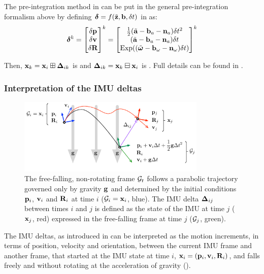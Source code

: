 The pre-integration method in  \cite{forster2017-TRO} can be put in the general pre-integration formalism above by defining 
$\bm\delta=f(\tilde{{\bf z}},{\bf b},\delta t)$ in  as:
%
\begin{align}
    \bm\delta^k = \begin{bmatrix}
    \delta{\bf p}\\\delta{\bf v}\\\delta{\bf R}
    \end{bmatrix}^k =
    \begin{bmatrix}
    \tfrac12(\tilde{{\bf a}}-{\bf b}_a-{\bf n}_a)\delta t^2 \\
    (\tilde{{\bf a}}-{\bf b}_a-{\bf n}_a)\delta t \\
    \operatorname*{Exp}((\tilde{{\bm \omega}}-{\bf b}_\omega-{\bf n}_\omega)\delta t)
    \end{bmatrix}^k
    \label{eq:delta_function}
\end{align}

Then, ${\bf x}_k={\bf x}_i\boxplus{{\bm \Delta}}_{ik}$ is \cite[eq.~32]{forster2017-TRO} and ${{\bm \Delta}}_{ik}={\bf x}_k\boxminus{\bf x}_i$ is \cite[eq.~33]{forster2017-TRO}. 
Full details can be found in \cite[Section 3.4]{atchuthan-18-thesis}.

\subsubsection{Interpretation of the IMU deltas}

\begin{figure}[h]
\centering
\includegraphics[width=0.8\textwidth]{figures/fff}
\caption{The free-falling, non-rotating frame $\mathcal{G}_t$ follows a parabolic trajectory governed only by gravity ${\bf g}$ and determined by the initial conditions ${\bf p}_i$, ${\bf v}_i$ and ${\bf R}_i$ at time $i$ ($\mathcal{G}_i={\bf x}_i$, blue). The IMU delta ${{\bm \Delta}}_{ij}$ between times $i$ and $j$ is defined as the state of the IMU at time $j$ (${\bf x}_j$, red) expressed in the free-falling frame at time $j$ ($\mathcal{G}_j$, green).}
\label{fig:fff}
\end{figure}

The IMU deltas, as introduced in \cite{lupton-09, forster2015imu} can be interpreted \cite{atchuthan-18-thesis} as the motion increments, in terms of position, velocity and orientation, between the current IMU frame and another frame, that started at the IMU state at time $i$, ${\bf x}_i=({\bf p}_i,{\bf v}_i,{\bf R}_i)$, and falls freely and without rotating at the acceleration of gravity ().



